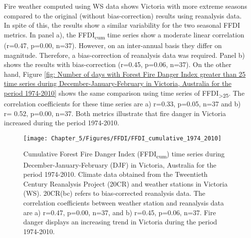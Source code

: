 Fire weather computed using WS data shows Victoria with more extreme
seasons compared to the original (without bias-correction) results
using reanalysis data. In spite of this, the results show a similar
variability for the two seasonal FFDI metrics. In panel a), the FFDI\textsubscript{cum}
time series show a moderate linear correlation (r=0.47, p=0.00, n=37).
However, on an inter-annual basis they differ on magnitude. Therefore,
a bias-correction of reanalysis data was required. Panel b) shows
the results with bias-correction (r=0.45, p=0.06, n=37). On the other
hand, Figure \ref{fig: Number of days with Forest Fire Danger Index greater than 25 time series during December-January-February in Victoria, Australia for the period 1974-2010}
shows the same comparison using time series of FFDI\textsubscript{>25}.
The correlation coefficients for these time series are a) r=0.33,
p=0.05, n=37 and b) r= 0.52, p=0.00, n=37. Both metrics illustrate
that fire danger in Victoria increased during the period 1974-2010.

\begin{figure}[h]
\noindent \begin{centering}
\texttt{[image: Chapter\_5/Figures/FFDI/FFDI\_cumulative\_1974\_2010]}
\par\end{centering}

\caption[Cumulative Forest Fire Danger Index (FFDI\protect\textsubscript{cum})
time series during December-January-February (DJF) in Victoria, Australia
for the period 1974-2010]{Cumulative Forest Fire Danger Index (FFDI\protect\textsubscript{cum})
time series during December-January-February (DJF) in Victoria, Australia
for the period 1974-2010. Climate data obtained from the Tweentieth
Century Reanalysis Project (20CR) and weather stations in Victoria
(WS). 20CR(bc) refers to bias-corrected reanalysis data. The correlation
coefficients between weather station and reanalysis data are a) r=0.47,
p=0.00, n=37, and b) r=0.45, p=0.06, n=37. Fire danger displays an
increasing trend in Victoria during the period 1974-2010. \label{fig: Cumulative Forest Fire Danger Index time series during December-January-February in Victoria, Australia for the period 1974-2010} }
\end{figure}


